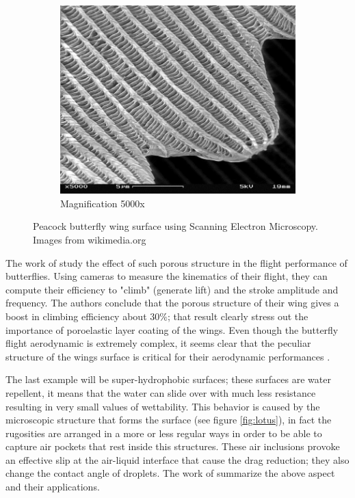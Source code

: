 \begin{figure}[h]
\begin{subfigure}[b]{0.3\textwidth}
	\end{subfigure}
	\begin{subfigure}[b]{0.3\textwidth}
		\includegraphics[width=\textwidth]{chapter_1/butterfly3}
		\caption{Magnification 5000x}
		\label{fig:b5000}
	\end{subfigure}
	\caption{Peacock butterfly wing surface using Scanning Electron Microscopy.  Images from wikimedia.org}
	\label{fig:butterfly}
\end{figure}

The work of \citet{slegers2017beneficial} study the effect of such porous structure in the flight performance of butterflies.
Using cameras to measure the kinematics of their flight, they can compute their efficiency to "climb" (generate lift) and the stroke amplitude and frequency.
The authors conclude that the porous structure of their wing gives a boost in climbing efficiency about $30\%$; that result clearly stress out the importance of poroelastic layer coating of the wings. 
Even though the butterfly flight aerodynamic is extremely complex, it seems clear that the peculiar structure of the wings surface is critical for their aerodynamic performances \citet{srygley2002unconventional}.

The last example will be super-hydrophobic surfaces; these surfaces are water repellent, it means that the water can slide over with much less resistance resulting in very small values of wettability.
This behavior is caused by the microscopic structure that forms the surface (see figure \ref{fig:lotus}), in fact the rugosities are arranged in a more or less regular ways in order to be able to capture air pockets that rest inside this structures.
These air inclusions provoke an effective slip at the air-liquid interface that cause the drag reduction; they also change the contact angle of droplets.
The work of \citet{bottaro2003effect} summarize the above aspect and their applications.

